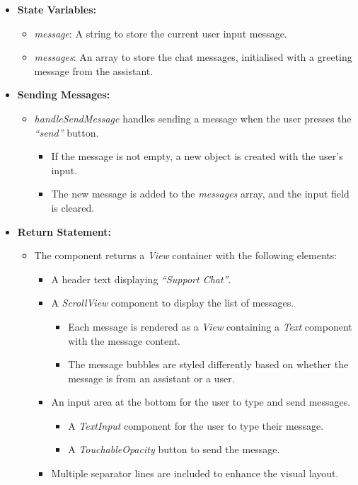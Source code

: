 \begin{itemize}
    \item \textbf{State Variables:}
    \begin{itemize}
        \item \textit{message}: A string to store the current user input message.
        \item \textit{messages}: An array to store the chat messages, initialised with a greeting message from the assistant.
    \end{itemize}

    \item \textbf{Sending Messages:}
    \begin{itemize}
        \item \textit{handleSendMessage} handles sending a message when the user presses the \textit{``send''} button.
        \begin{itemize}
            \item If the message is not empty, a new object is created with the user's input.
            \item The new message is added to the \textit{messages} array, and the input field is cleared.
        \end{itemize}
    \end{itemize}

    \item \textbf{Return Statement:}
    \begin{itemize}
        \item The component returns a \textit{View} container with the following elements:
        \begin{itemize}
            \item A header text displaying \textit{``Support Chat''}.
            \item A \textit{ScrollView} component to display the list of messages.
            \begin{itemize}
                \item Each message is rendered as a \textit{View} containing a \textit{Text} component with the message content.
                \item The message bubbles are styled differently based on whether the message is from an assistant or a user.
            \end{itemize}
            \item An input area at the bottom for the user to type and send messages.
            \begin{itemize}
                \item A \textit{TextInput} component for the user to type their message.
                \item A \textit{TouchableOpacity} button to send the message.
            \end{itemize}
            \item Multiple separator lines are included to enhance the visual layout.
        \end{itemize}
    \end{itemize}
\end{itemize}

